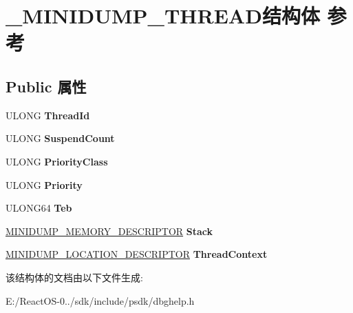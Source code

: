 \hypertarget{struct___m_i_n_i_d_u_m_p___t_h_r_e_a_d}{}\section{\+\_\+\+M\+I\+N\+I\+D\+U\+M\+P\+\_\+\+T\+H\+R\+E\+A\+D结构体 参考}
\label{struct___m_i_n_i_d_u_m_p___t_h_r_e_a_d}
\subsection*{Public 属性}
\begin{DoxyCompactItemize}
\item 
\mbox{\label{struct___m_i_n_i_d_u_m_p___t_h_r_e_a_d_a7e1e9440ad9b567b77e2ef41e6c0f456}} 
U\+L\+O\+NG {\bfseries Thread\+Id}
\item 
\mbox{\label{struct___m_i_n_i_d_u_m_p___t_h_r_e_a_d_ac30163ec3294fa67d6a0c0f76ce7a2c4}} 
U\+L\+O\+NG {\bfseries Suspend\+Count}
\item 
\mbox{\label{struct___m_i_n_i_d_u_m_p___t_h_r_e_a_d_ab43c395a115d49eb09031c1bf2d04cfa}} 
U\+L\+O\+NG {\bfseries Priority\+Class}
\item 
\mbox{\label{struct___m_i_n_i_d_u_m_p___t_h_r_e_a_d_a3be3d1ab4246a5ef3401d3b72f674a82}} 
U\+L\+O\+NG {\bfseries Priority}
\item 
\mbox{\label{struct___m_i_n_i_d_u_m_p___t_h_r_e_a_d_aa2b4b229cb305a8879709788a21d7de8}} 
U\+L\+O\+N\+G64 {\bfseries Teb}
\item 
\mbox{\label{struct___m_i_n_i_d_u_m_p___t_h_r_e_a_d_ae29156295af6323b5b6a37229ab17491}} 
\hyperlink{struct___m_i_n_i_d_u_m_p___m_e_m_o_r_y___d_e_s_c_r_i_p_t_o_r}{M\+I\+N\+I\+D\+U\+M\+P\+\_\+\+M\+E\+M\+O\+R\+Y\+\_\+\+D\+E\+S\+C\+R\+I\+P\+T\+OR} {\bfseries Stack}
\item 
\mbox{\label{struct___m_i_n_i_d_u_m_p___t_h_r_e_a_d_a14a5b6c76f14bff33dc83e14d9885442}} 
\hyperlink{struct___m_i_n_i_d_u_m_p___l_o_c_a_t_i_o_n___d_e_s_c_r_i_p_t_o_r}{M\+I\+N\+I\+D\+U\+M\+P\+\_\+\+L\+O\+C\+A\+T\+I\+O\+N\+\_\+\+D\+E\+S\+C\+R\+I\+P\+T\+OR} {\bfseries Thread\+Context}
\end{DoxyCompactItemize}


该结构体的文档由以下文件生成\+:\begin{DoxyCompactItemize}
\item 
E\+:/\+React\+O\+S-\/0../sdk/include/psdk/dbghelp.\+h\end{DoxyCompactItemize}
